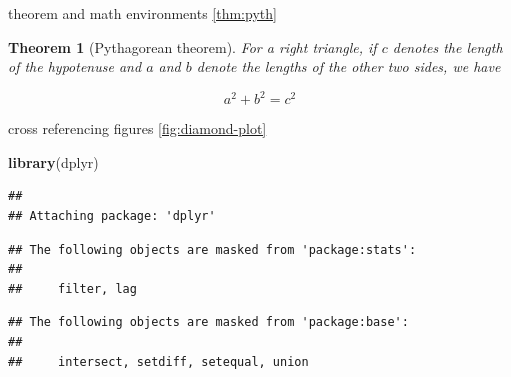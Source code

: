 \documentclass[]{interact}
\theoremstyle{plain}%
\newtheorem{theorem}{Theorem}[section]
\theoremstyle{definition}
\theoremstyle{remark}
\newenvironment{Shaded}{\begin{snugshade}}{\end{snugshade}}
\newcommand{\DataTypeTok}[1]{\textcolor[rgb]{0.13,0.29,0.53}{#1}}
\newcommand{\DecValTok}[1]{\textcolor[rgb]{0.00,0.00,0.81}{#1}}
\newcommand{\KeywordTok}[1]{\textcolor[rgb]{0.13,0.29,0.53}{\textbf{#1}}}
\newcommand{\NormalTok}[1]{#1}
\newcommand{\OperatorTok}[1]{\textcolor[rgb]{0.81,0.36,0.00}{\textbf{#1}}}
\newcommand{\StringTok}[1]{\textcolor[rgb]{0.31,0.60,0.02}{#1}}
\begin{document}
theorem and math environments \ref{thm:pyth}

\begin{theorem}[Pythagorean theorem]
\protect\hypertarget{thm:pyth}{}{\label{thm:pyth} {} }For a right triangle, if \(c\) denotes the length of the hypotenuse
and \(a\) and \(b\) denote the lengths of the other two sides, we have

\[a^2 + b^2 = c^2\]
\end{theorem}

cross referencing figures \ref{fig:diamond-plot}

\begin{Shaded}
\begin{Highlighting}[]
\KeywordTok{library}\NormalTok{(dplyr)}
\end{Highlighting}
\end{Shaded}

\begin{verbatim}
## 
## Attaching package: 'dplyr'
\end{verbatim}

\begin{verbatim}
## The following objects are masked from 'package:stats':
## 
##     filter, lag
\end{verbatim}

\begin{verbatim}
## The following objects are masked from 'package:base':
## 
##     intersect, setdiff, setequal, union
\end{verbatim}

\begin{Shaded}
\end{Shaded}
\end{document}
